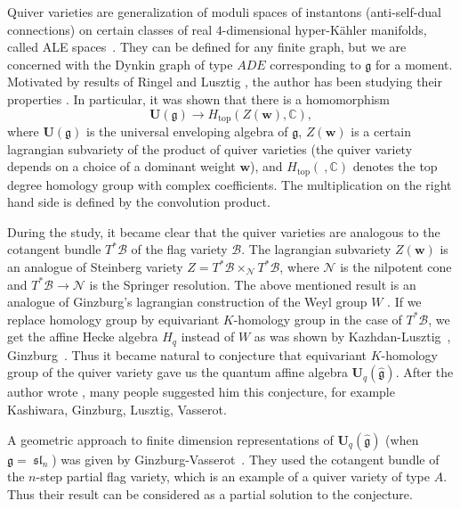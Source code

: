 \documentclass[12pt]{amsart}
\def\Bbb{\mathbb}
\def\frak{\mathfrak}
\theoremstyle{definition}
\theoremstyle{remark}
\numberwithin{equation}{subsection}
\newcommand{\C}{{\Bbb C}}
\newcommand{\algsl}{\operatorname{\frak{sl}}} %
\newcommand{\bw}{{\mathbf w}} %
\newcommand{\topdeg}{\operatorname{top}} %
\newcommand{\Ua}{{\mathbf U}_q(\widehat{\mathfrak g})} %
\begin{document}
Quiver varieties are generalization of moduli spaces of instantons
(anti-self-dual connections) on certain classes of real
$4$-dimensional hyper-K\"ahler manifolds, called ALE spaces~\cite{KN}.
%
They can be defined for any finite graph, but we are concerned with
the Dynkin graph of type $ADE$ corresponding to $\mathfrak g$ for a
moment.
%
Motivated by results of Ringel \cite{Ri} and Lusztig \cite{Lu},
the author has been studying their properties \cite{Na-quiver,Na-alg}.
%
In particular, it was shown that there is a homomorphism
\[
   {\mathbf U}(\mathfrak g) \to H_{\topdeg}(Z(\bw),\C),
\]
where ${\mathbf U}(\mathfrak g)$ is the universal enveloping algebra
of $\mathfrak g$, $Z(\bw)$ is a certain lagrangian subvariety of the
product of quiver varieties (the quiver variety depends on a choice of
a dominant weight $\bw$), and $H_{\topdeg}(\ ,\C)$ denotes the top
degree homology group with complex coefficients. The multiplication on
the right hand side is defined by the convolution product.

During the study, it became clear that the quiver varieties are
analogous to the cotangent bundle $T^*\mathcal B$ of the flag variety
$\mathcal B$.
%
The lagrangian subvariety $Z(\bw)$ is an analogue of Steinberg
variety $Z = T^*\mathcal B\times_{\mathcal N} T^*\mathcal B$, where
$\mathcal N$ is the nilpotent cone and $T^*\mathcal B\to \mathcal N$
is the Springer resolution.
%
The above mentioned result is an analogue of Ginzburg's lagrangian
construction of the Weyl group $W$ \cite{Gi-La}.
%
If we replace homology group by equivariant $K$-homology group in the
case of $T^*\mathcal B$, we get the affine Hecke algebra $H_q$ instead
of $W$ as was shown by Kazhdan-Lusztig~\cite{KL},
Ginzburg~\cite{Gi-book}.
%
Thus it became natural to conjecture that equivariant $K$-homology
group of the quiver variety gave us the quantum affine algebra $\Ua$.
%
After the author wrote \cite{Na-quiver}, many people suggested him
this conjecture, for example Kashiwara, Ginzburg, Lusztig, Vasserot.

A geometric approach to finite dimension representations of $\Ua$
(when $\mathfrak g = \algsl_n$) was given by
Ginzburg-Vasserot~\cite{GV,Vasserot}.
%
They used the cotangent bundle of the $n$-step partial flag variety,
which is an example of a quiver variety of type $A$. Thus their result
can be considered as a partial solution to the conjecture.
\end{document}
